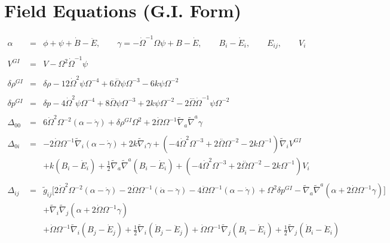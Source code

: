 \documentclass[10pt,letterpaper]{article}
\numberwithin{equation}{section}
\begin{document}
\section{Field Equations (G.I. Form)}
\begin{eqnarray}
\alpha  &=& \phi + \psi + \dot B - \ddot E,\qquad \gamma = - \dot\Omega^{-1}\Omega \psi + B - \dot E,
\qquad B_i - \dot E_i,\qquad E_{ij},\qquad V_i
\\ \nonumber\\
V^{GI} &=& V-\Omega^2 \dot \Omega^{-1}\psi
\\ \nonumber\\
\delta \rho^{GI}&=&\delta \rho - 12 \dot{\Omega}^2 \psi \Omega^{-4} + 6 \overset{..}{\Omega} \psi \Omega^{-3} - 6 k \psi \Omega^{-2}
\\ \nonumber\\ 
\delta p^{GI}&=&\delta p - 4 \dot{\Omega}^2 \psi \Omega^{-4} + 8 \overset{..}{\Omega} \psi \Omega^{-3} + 2 k \psi \Omega^{-2} - 2 \overset{...}{\Omega} \dot{\Omega}^{-1} \psi \Omega^{-2}
\\ \nonumber\\
\Delta_{00}&=& 6 \dot{\Omega}^2 \Omega^{-2}(\alpha-\dot\gamma) + \delta \rho^{GI}{} \Omega^2 + 2 \dot{\Omega} \Omega^{-1} \tilde{\nabla}_{a}\tilde{\nabla}^{a}\gamma 
\\  \nonumber\\ 
\Delta_{0i}&=& -2 \dot{\Omega} \Omega^{-1} \tilde{\nabla}_{i}(\alpha - \dot\gamma) + 2 k \tilde{\nabla}_{i}\gamma 
+(-4 \dot{\Omega}^2 \Omega^{-3}  + 2 \overset{..}{\Omega} \Omega^{-2}  - 2 k \Omega^{-1}) \tilde{\nabla}_{i}V^{GI}
\nonumber\\
&& +k(B_i-\dot E_i)+ \tfrac{1}{2} \tilde{\nabla}_{a}\tilde{\nabla}^{a}(B_{i} - \dot{E}_{i})
+ (-4 \dot{\Omega}^2 \Omega^{-3} + 2 \overset{..}{\Omega} \Omega^{-2} - 2 k \Omega^{-1})V_{i} 
\\  \nonumber\\ 
\Delta_{ij}&=& \tilde g_{ij}\big[ 2 \dot{\Omega}^2 \Omega^{-2}(\alpha-\dot\gamma)
-2  \dot{\Omega} \Omega^{-1}(\dot\alpha -\ddot\gamma)-4\ddot\Omega\Omega^{-1}(\alpha-\dot\gamma)+ \Omega^2 \delta p^{GI}-\tilde\nabla_a\tilde\nabla^a( \alpha + 2\dot\Omega \Omega^{-1}\gamma) \big] 
\nonumber\\
&&+\tilde\nabla_i\tilde\nabla_j( \alpha + 2\dot\Omega \Omega^{-1}\gamma)
\nonumber\\
&& +\dot{\Omega} \Omega^{-1} \tilde{\nabla}_{i}(B_{j}-\dot E_j)+\tfrac{1}{2} \tilde{\nabla}_{i}(\dot{B}_{j}-\ddot{E}_j)
+\dot{\Omega} \Omega^{-1} \tilde{\nabla}_{j}(B_{i}-\dot E_i)+\tfrac{1}{2} \tilde{\nabla}_{j}(\dot{B}_{i}-\ddot{E}_i)

\end{eqnarray}
\end{document}
